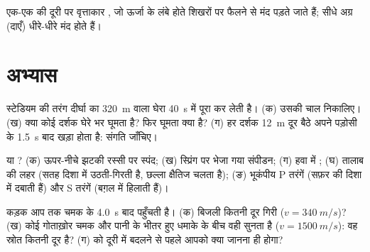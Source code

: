 \begin{omfigure}

{\small एक-एक  की दूरी पर वृत्ताकार ,
जो ऊर्जा के लंबे होते शिखरों पर फैलने से मंद पड़ते जाते हैं; सीधे
अग्र (दाएँ) धीरे-धीरे मंद होते हैं।}
\end{omfigure}

\section{अभ्यास}

\begin{exercise}[$\star$]\label{exo:g12:mechanical-waves:1}
स्टेडियम की तरंग दीर्घा का \qty{320}{m} वाला घेरा \qty{40}{s} में पूरा कर
लेती है। (क) उसकी चाल निकालिए। (ख) क्या कोई दर्शक घेरे भर घूमता है? फिर घूमता
क्या है? (ग) हर दर्शक \qty{12}{m} दूर बैठे अपने पड़ोसी के \qty{1.5}{s} बाद खड़ा होता
है: संगति जाँचिए।
\end{exercise}

\begin{exercise}[$\star$]\label{exo:g12:mechanical-waves:2}
 या ? (क) ऊपर-नीचे झटकी रस्सी पर स्पंद;
(ख) स्प्रिंग पर भेजा गया संपीडन; (ग) हवा में ; (घ) तालाब की
लहर (सतह  दिशा में उठती-गिरती है, छल्ला क्षैतिज चलता है);
(ङ) भूकंपीय P तरंगें (सफ़र की दिशा में दबाती हैं) और S
तरंगें (बग़ल में हिलाती हैं)।
\end{exercise}

\begin{exercise}[$\star$]\label{exo:g12:mechanical-waves:3}
कड़क आप तक चमक के \qty{4.0}{s} बाद पहुँचती है। (क) बिजली कितनी दूर गिरी ($v = \qty{340}{m/s}$)?
(ख) कोई गोताख़ोर चमक और पानी के भीतर हुए धमाके के बीच वही 
सुनता है ($v = \qty{1500}{m/s}$): वह स्रोत कितनी दूर है? (ग)  को दूरी में
बदलने से पहले आपको क्या जानना ही होगा?
\end{exercise}

